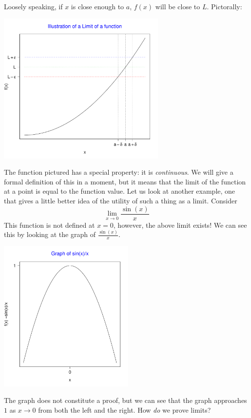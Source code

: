 \documentclass[12pt,a4paper]{article} %
\begin{document}
Loosely speaking, if $x$ is close enough to $a$, $f(x)$ will be close to $L$.  Pictorally:

\includegraphics[height=3in]{limit.pdf}

The function pictured has a special property: it is \emph{continuous}.  We will give a formal definition of this in a moment, but it means that the limit of the function at a point is equal to the function value.  Let us look at another example, one that gives a little better idea of the utility of such a thing as a limit.  Consider\\

\begin{equation}
\lim_{x\rightarrow 0}\frac{\sin(x)}{x}
\end{equation}
This function is not defined at $x=0$, however, the above limit exists!  We can see this by looking at the graph of $\frac{\sin(x)}{x}$.  

\includegraphics[height=3in]{sinxoverx.pdf}

The graph does not constitute a proof, but we can see that the graph approaches $1$ as $x\rightarrow 0$ from both the left and the right.    How \emph{do} we prove limits?
\end{document}
